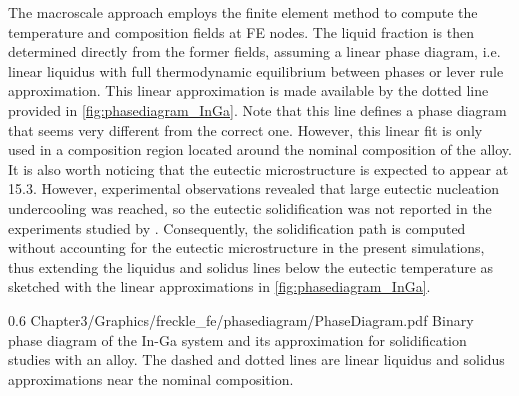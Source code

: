 The macroscale approach employs the finite element method to compute the temperature and composition fields at FE nodes. 
The liquid fraction is then determined directly from the former fields, assuming a linear phase diagram, i.e. linear liquidus 
with full thermodynamic equilibrium between phases or lever rule approximation. This linear approximation is made available by 
the dotted line provided in \cref{fig:phasediagram_InGa}. Note that this line defines a phase diagram that seems very different from the correct one. 
However, this linear fit is only used in a composition region located around the nominal composition of the alloy. It is also worth 
noticing that the eutectic microstructure is expected to appear at \SI{15.3}{\udegC}. However, experimental observations revealed that large 
eutectic nucleation undercooling was reached, so the eutectic solidification was not reported in the experiments studied by 
\citet{shevchenko_chimney_2013}. Consequently, the solidification path is computed without accounting for the eutectic microstructure 
in the present simulations, thus extending the liquidus and solidus lines below the eutectic temperature as sketched with the linear 
approximations in \cref{fig:phasediagram_InGa}.
%
\begin{figureth}
{0.6}
{Chapter3/Graphics/freckle_fe/phasediagram/PhaseDiagram.pdf}
{Binary phase diagram of the In-Ga system \citep{andersson_thermo-calc_2002,tcbin_tcbin:_2006} and 
its approximation for solidification studies with an  alloy. 
The dashed and dotted lines are linear liquidus and solidus approximations near the nominal composition.}
\label{fig:phasediagram_InGa}
\end{figureth}
%
